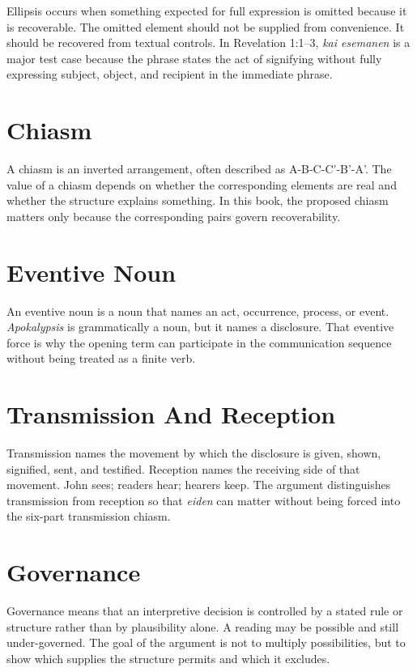 Ellipsis occurs when something expected for full expression is omitted because it is recoverable. The omitted element should not be supplied from convenience. It should be recovered from textual controls. In Revelation 1:1--3, \textit{kai esemanen} is a major test case because the phrase states the act of signifying without fully expressing subject, object, and recipient in the immediate phrase.

\section{Chiasm}

A chiasm is an inverted arrangement, often described as A-B-C-C'-B'-A'. The value of a chiasm depends on whether the corresponding elements are real and whether the structure explains something. In this book, the proposed chiasm matters only because the corresponding pairs govern recoverability.

\section{Eventive Noun}

An eventive noun is a noun that names an act, occurrence, process, or event. \textit{Apokalypsis} is grammatically a noun, but it names a disclosure. That eventive force is why the opening term can participate in the communication sequence without being treated as a finite verb.

\section{Transmission And Reception}

Transmission names the movement by which the disclosure is given, shown, signified, sent, and testified. Reception names the receiving side of that movement. John sees; readers hear; hearers keep. The argument distinguishes transmission from reception so that \textit{eiden} can matter without being forced into the six-part transmission chiasm.

\section{Governance}

Governance means that an interpretive decision is controlled by a stated rule or structure rather than by plausibility alone. A reading may be possible and still under-governed. The goal of the argument is not to multiply possibilities, but to show which supplies the structure permits and which it excludes.
